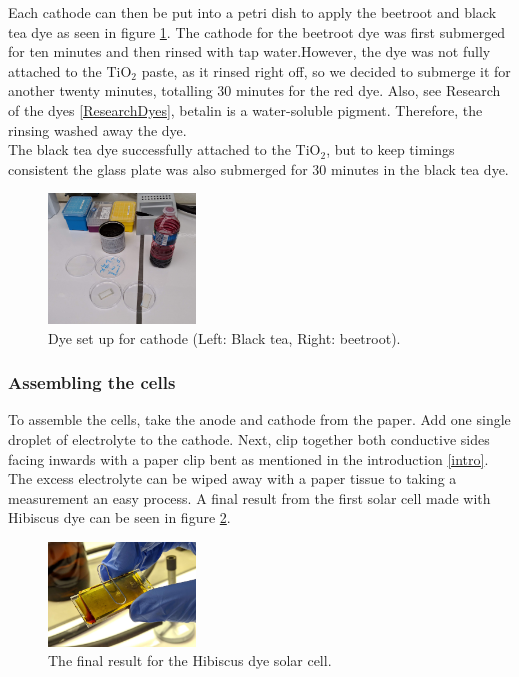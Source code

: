 \documentclass[conference]{IEEEtran}
\begin{document}
Each cathode can then be put into a petri dish to apply the beetroot and black tea dye as seen in figure \ref{fig:dyesetup}. The cathode for the beetroot dye was first submerged for ten minutes and then rinsed with tap water.However, the dye was not fully attached to the TiO$_2$ paste, as it rinsed right off, so we decided to submerge it for another twenty minutes, totalling 30 minutes for the red dye. Also, see Research of the dyes \ref{ResearchDyes}, betalin is a water-soluble pigment. Therefore, the rinsing washed away the dye.\\

The black tea dye successfully attached to the TiO$_2$, but to keep timings consistent the glass plate was also submerged for 30 minutes in the black tea dye.

\begin{figure}[H]
\centering
\includegraphics[width=0.35\textwidth]{img/12StartLab2.jpg}
\caption{Dye set up for cathode (Left: Black tea, Right: beetroot).}
\label{fig:dyesetup} %
\end{figure}

\subsubsection{Assembling the cells}
To assemble the cells, take the anode and cathode from the paper. Add one single droplet of electrolyte to the cathode. Next, clip together both conductive sides facing inwards with a paper clip bent as mentioned in the introduction \ref{intro}.
The excess electrolyte can be wiped away with a paper tissue to taking a measurement an easy process. A final result from the first solar cell made with Hibiscus dye can be seen in figure \ref{fig:resultsolarcell}.

\begin{figure}[H]
\centering
\includegraphics[width=0.35\textwidth]{img/10ElectroliteAndClamped.jpg}
\caption{The final result for the Hibiscus dye solar cell.}
\label{fig:resultsolarcell} %
\end{figure}
\end{document}
